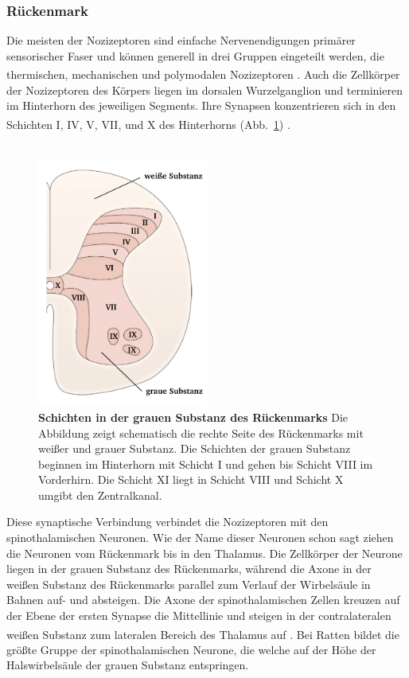 \documentclass[12pt,a4paper,pdftex]{article}
\begin{document}
\subsubsection*{Rückenmark}

Die meisten der Nozizeptoren sind einfache Nervenendigungen primärer sensorischer Faser und können generell in drei Gruppen eingeteilt werden, die thermischen, mechanischen und polymodalen Nozizeptoren \textsuperscript{\cite[24]{kandel2013principles}}. Auch die Zellkörper der Nozizeptoren des Körpers liegen im dorsalen Wurzelganglion und terminieren im Hinterhorn des jeweiligen Segments. Ihre Synapsen konzentrieren sich in den Schichten I, IV, V, VII, und X des Hinterhorns (Abb.~\ref{fig:graymatter}) \textsuperscript{\cite[25]{paxinos2014rat}}.
\\
\\

\begin{figure}[H]
        \centering
        \includegraphics[width = 0.5\textwidth]
        {pictures/somatosensory/gray_matter.png}
        \caption[Schichten in der grauen Substanz des Rückenmarks]{\textbf{Schichten in der grauen Substanz des Rückenmarks} Die Abbildung zeigt schematisch die rechte Seite des Rückenmarks mit weißer und grauer Substanz. Die Schichten der grauen Substanz beginnen im Hinterhorn mit Schicht I und gehen bis Schicht VIII im Vorderhirn. Die Schicht XI liegt in Schicht VIII und Schicht X umgibt den Zentralkanal.
        \cite[8]{crossman2014neuroanatomy}}
        \label{fig:graymatter}
    \end{figure}

\newpage
Diese synaptische Verbindung verbindet die Nozizeptoren mit den spinothalamischen Neuronen. Wie der Name dieser Neuronen schon sagt ziehen die Neuronen vom Rückenmark bis in den Thalamus. Die Zellkörper der Neurone liegen in der grauen Substanz des Rückenmarks, während die Axone in der weißen Substanz des Rückenmarks parallel zum Verlauf der Wirbelsäule in Bahnen auf- und absteigen. Die Axone der spinothalamischen Zellen kreuzen auf der Ebene der ersten Synapse die Mittellinie und steigen in der contralateralen weißen Substanz zum lateralen Bereich des Thalamus auf \textsuperscript{\cite[25]{paxinos2014rat}}. Bei Ratten bildet die größte Gruppe der spinothalamischen Neurone, die welche auf der Höhe der Halswirbelsäule der grauen Substanz entspringen.
\end{document}
